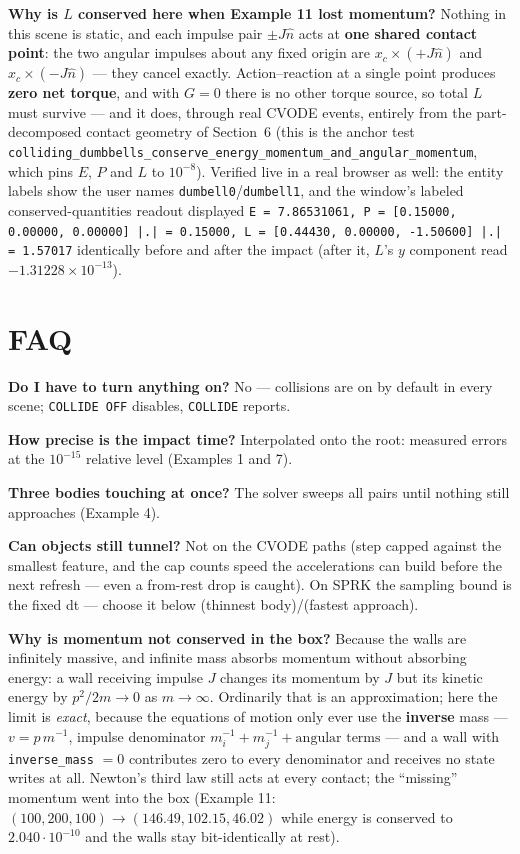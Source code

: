 \documentclass[11pt]{article}
\newcommand{\kw}[1]{\texttt{\uppercase{#1}}}
\newcommand{\code}[1]{\texttt{#1}}
\begin{document}
\textbf{Why is $L$ conserved here when Example 11 lost momentum?} Nothing
in this scene is static, and each impulse pair $\pm J\hat n$ acts at
\textbf{one shared contact point}: the two angular impulses about any fixed
origin are $x_c \times (+J\hat n)$ and $x_c \times (-J\hat n)$ --- they
cancel exactly. Action--reaction at a single point produces \textbf{zero
net torque}, and with $G = 0$ there is no other torque source, so total
$L$ must survive --- and it does, through real CVODE events, entirely from
the part-decomposed contact geometry of Section~6 (this is the anchor test
\code{colliding\_dumbbells\_conserve\_energy\_momentum\_and\_angular\_momentum},
which pins $E$, $P$ and $L$ to $10^{-8}$). Verified live in a real browser
as well: the entity labels show the user names
\code{dumbell0}/\code{dumbell1}, and the window's labeled
conserved-quantities readout displayed
\code{E = 7.86531061, P = [0.15000, 0.00000, 0.00000] |.| = 0.15000, L =
[0.44430, 0.00000, -1.50600] |.| = 1.57017} identically before and after
the impact (after it, $L$'s $y$ component read $-1.31228\times10^{-13}$).

\section{FAQ}

\textbf{Do I have to turn anything on?} No --- collisions are on by default in
every scene; \kw{collide off} disables, \kw{collide} reports.

\textbf{How precise is the impact time?} Interpolated onto the root: measured
errors at the $10^{-15}$ relative level (Examples 1 and 7).

\textbf{Three bodies touching at once?} The solver sweeps all pairs until
nothing still approaches (Example 4).

\textbf{Can objects still tunnel?} Not on the CVODE paths (step capped
against the smallest feature, and the cap counts speed the accelerations
can build before the next refresh --- even a from-rest drop is caught). On
SPRK the sampling bound is the fixed dt --- choose it below (thinnest
body)/(fastest approach).

\textbf{Why is momentum not conserved in the box?} Because the walls are
infinitely massive, and infinite mass absorbs momentum without absorbing
energy: a wall receiving impulse $J$ changes its momentum by $J$ but its
kinetic energy by $p^2/2m \to 0$ as $m \to \infty$. Ordinarily that is an
approximation; here the limit is \emph{exact}, because the equations of
motion only ever use the \textbf{inverse} mass --- $v = p\,m^{-1}$, impulse
denominator $m_i^{-1} + m_j^{-1} + \text{angular terms}$ --- and a wall with
\code{inverse\_mass} $= 0$ contributes zero to every denominator and
receives no state writes at all. Newton's third law still acts at every
contact; the ``missing'' momentum went into the box (Example 11:
$(100, 200, 100) \to (146.49, 102.15, 46.02)$ while energy is conserved to
$2.040 \cdot 10^{-10}$ and the walls stay bit-identically at rest).
\end{document}
